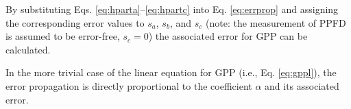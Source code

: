 By substituting Eqs. \ref{eq:hparta}--\ref{eq:hpartc} into Eq. \ref{eq:errprop} and assigning the corresponding error values to $s_{a}$, $s_{b}$, and $s_{c}$ (note: the measurement of PPFD is assumed to be error-free, $s_{c} = 0$) the associated error for GPP can be calculated. 

In the more trivial case of the linear equation for GPP (i.e., Eq. \ref{eq:gppl}), the error propagation is directly proportional to the coefficient $\alpha$ and its associated error.
